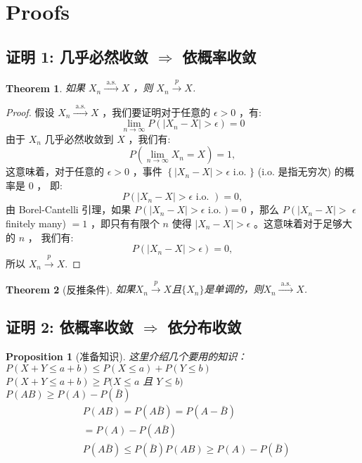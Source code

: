 \documentclass[UTF8,12pt]{ctexart}
\numberwithin{equation}{section}%
\newtheorem{thm}{Theorem}[section]
\newtheorem{proposition}{Proposition}[section]
\begin{document}
	\section{Proofs}
	\subsection{证明 1: 几乎必然收敛 $\Rightarrow$ 依概率收敛}
	\begin{thm}
		如果 $X_n \stackrel{\text { a.s. }}{\longrightarrow} X$ ，则 $X_n \stackrel{p}{\longrightarrow} X$.
	\end{thm}
	\begin{proof}
		假设 $X_n \stackrel{\text { a.s. }}{\longrightarrow} X$ ，我们要证明对于任意的 $\epsilon>0$ ，有:
		$$
		\lim _{n \rightarrow \infty} P\left(\left|X_n-X\right|>\epsilon\right)=0
		$$
		由于 $X_n$ 几乎必然收敛到 $X$ ，我们有:
		$$
		P\left(\lim _{n \rightarrow \infty} X_n=X\right)=1,
		$$
		这意味着，对于任意的 $\epsilon>0$ ，事件 $\left\{\left|X_n-X\right|>\epsilon\right.$ i.o. $\}$ (i.o. 是指无穷次) 的概率是 0 ， 即:
		$$
		P\left(\left|X_n-X\right|>\epsilon \text { i.o. }\right)=0,
		$$
		由 Borel-Cantelli 引理，如果 $P\left(\left|X_n-X\right|>\epsilon\right.$ i.o. $)=0$ ，那么 $P\left(\left|X_n-X\right|>\right.$ $\epsilon$ finitely many) $=1$ ，即只有有限个 $n$ 使得 $\left|X_n-X\right|>\epsilon$ 。这意味着对于足够大的 $n$ ， 我们有:
		$$
		P\left(\left|X_n-X\right|>\epsilon\right)=0,
		$$
		所以 $X_n \stackrel{p}{\longrightarrow} X$.
	\end{proof}
	
	\begin{thm}[反推条件]
		如果$X_n \stackrel{p}{\longrightarrow} X$且$\{X_n\}$是单调的，则$X_n \stackrel{\text { a.s. }}{\longrightarrow} X$.
	\end{thm}
	
	\subsection{证明 2: 依概率收敛 $\Rightarrow$ 依分布收敛}
	
	
	\begin{proposition}[准备知识] 这里介绍几个要用的知识：\\
		$P(X+Y \leqslant a+b) \leq P(X \leqslant a)+P(Y \leqslant b)$\\
		$P(X+Y \leq a+b) \geqslant P(X \leq a$ 且 $Y \leqslant b)$\\
		$P(A B) \geqslant P(A)-P(\bar{B})$
		$$
		\begin{aligned}
			& P(A B)=P(A \bar{B})=P(A-\bar{B}) \\
			&=P(A)-P(A \bar{B}) \\
			& P(A \bar{B}) \leq P(\bar{B}) P(A B) \geq P(A)-P(\bar{B})
		\end{aligned}
		$$	
	\end{proposition}
	
\end{document}
